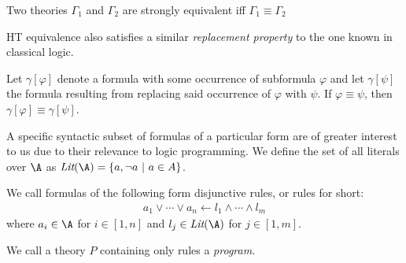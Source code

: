 \begin{proposition}
  Two theories $\Gamma_1$ and $\Gamma_2$ are strongly equivalent
  iff $\Gamma_1 \equiv \Gamma_2$
\end{proposition}

HT equivalence also satisfies a similar \textit{replacement property}
to the one known in classical logic.

\begin{proposition}
  Let $\gamma[\varphi]$ denote a formula with some occurrence of
  subformula $\varphi$ and let $\gamma[\psi]$ the formula resulting
  from replacing said occurrence of $\varphi$ with $\psi$. If
  $\varphi \equiv \psi$, then $\gamma[\varphi] \equiv \gamma[\psi]$.
\end{proposition}

A specific syntactic subset of formulas of a particular form are of
greater interest to us due to their relevance to logic programming.
We define the set of all literals over $\A$ as  $\textit{Lit}(\A) = \{ a, \lnot a\ |\ a \in A \}$.

\begin{definition}
    We call formulas of the following form disjunctive rules, or rules for short:
\begin{align*}
    a_1 \vee \cdots \vee a_{n} \leftarrow l_{1} \wedge \cdots \wedge l_{m}
\end{align*}
where $a_{i}\in \A$ for $i \in [1,n]$ and $l_{j} \in \textit{Lit}(\A)$ for $j \in [1,m]$.
\end{definition}

We call a theory $P$ containing only rules a \textit{program}.
